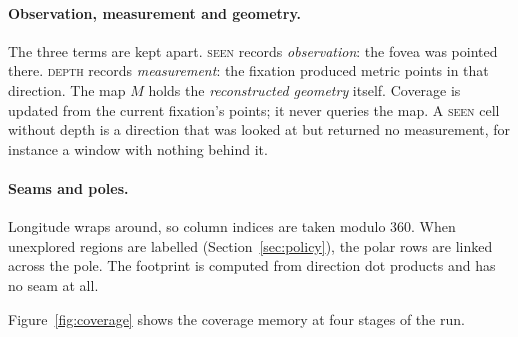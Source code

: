 \documentclass[11pt,a4paper]{article}
\begin{document}
\paragraph{Observation, measurement and geometry.} The three terms are kept apart. \textsc{seen} records
\emph{observation}: the fovea was pointed there. \textsc{depth} records \emph{measurement}: the fixation produced
metric points in that direction. The map $M$ holds the \emph{reconstructed geometry} itself. Coverage is updated from
the current fixation's points; it never queries the map. A \textsc{seen} cell without depth is a direction that was
looked at but returned no measurement, for instance a window with nothing behind it.

\paragraph{Seams and poles.} Longitude wraps around, so column indices are taken modulo 360. When unexplored regions
are labelled (Section~\ref{sec:policy}), the polar rows are linked across the pole. The footprint is computed from
direction dot products and has no seam at all.

Figure~\ref{fig:coverage} shows the coverage memory at four stages of the run.
\end{document}
